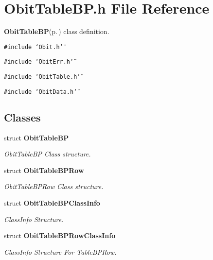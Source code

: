 \section{Obit\-Table\-BP.h File Reference}
\label{ObitTableBP_8h}
{\bf Obit\-Table\-BP}{\rm (p.\,\pageref{structObitTableBP})} class definition. 

{\tt \#include \char`\"{}Obit.h\char`\"{}}\par
{\tt \#include \char`\"{}Obit\-Err.h\char`\"{}}\par
{\tt \#include \char`\"{}Obit\-Table.h\char`\"{}}\par
{\tt \#include \char`\"{}Obit\-Data.h\char`\"{}}\par
\subsection*{Classes}
\begin{CompactItemize}
\item 
struct {\bf Obit\-Table\-BP}
\begin{CompactList}\small\item\em Obit\-Table\-BP Class structure. \item\end{CompactList}\item 
struct {\bf Obit\-Table\-BPRow}
\begin{CompactList}\small\item\em Obit\-Table\-BPRow Class structure. \item\end{CompactList}\item 
struct {\bf Obit\-Table\-BPClass\-Info}
\begin{CompactList}\small\item\em Class\-Info Structure. \item\end{CompactList}\item 
struct {\bf Obit\-Table\-BPRow\-Class\-Info}
\begin{CompactList}\small\item\em Class\-Info Structure For Table\-BPRow. \item\end{CompactList}\end{CompactItemize}
